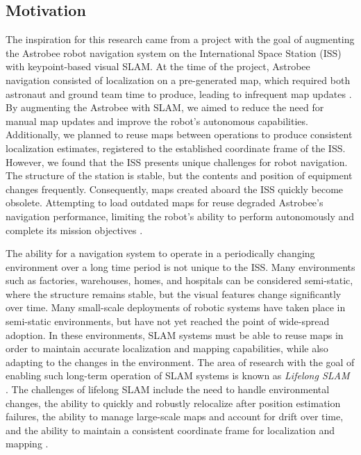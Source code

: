 \subsection{Motivation}


The inspiration for this research came from a project with the goal of augmenting the Astrobee robot navigation system on the International Space Station (ISS) with keypoint-based visual SLAM. At the time of the project, Astrobee navigation consisted of localization on a pre-generated map, which required both astronaut and ground team time to produce, leading to infrequent map updates \cite{soussanAstroLocEfficientRobust2022}. By augmenting the Astrobee with SLAM, we aimed to reduce the need for manual map updates and improve the robot's autonomous capabilities. Additionally, we planned to reuse maps between operations to produce consistent localization estimates, registered to the established coordinate frame of the ISS. However, we found that the ISS presents unique challenges for robot navigation. The structure of the station is stable, but the contents and position of equipment changes frequently. Consequently, maps created aboard the ISS quickly become obsolete. Attempting to load outdated maps for reuse degraded Astrobee's navigation performance, limiting the robot's ability to perform autonomously and complete its mission objectives \cite{zuralesCollaborativeSensingMapping2024}.


The ability for a navigation system to operate in a periodically changing environment over a long time period is not unique to the ISS. Many environments such as factories, warehouses, homes, and hospitals can be considered semi-static, where the structure remains stable, but the visual features change significantly over time. Many small-scale deployments of robotic systems have taken place in semi-static environments, but have not yet reached the point of wide-spread adoption. In these environments, SLAM systems must be able to reuse maps in order to maintain accurate localization and mapping capabilities, while also adapting to the changes in the environment. The area of research with the goal of enabling such long-term operation of SLAM systems is known as \textit{Lifelong SLAM} \cite{bujancaRobustSLAMSystems2021}. The challenges of lifelong SLAM include the need to handle environmental changes, the ability to quickly and robustly relocalize after position estimation failures, the ability to manage large-scale maps and account for drift over time, and the ability to maintain a consistent coordinate frame for localization and mapping \cite{saputraVisualSLAMStructure2019}.

